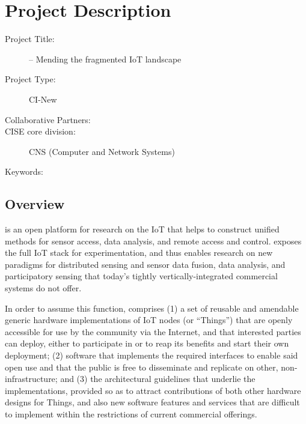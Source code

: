 
\section{Project Description}


\begin{description}
  \item[Project Title:] \sysname -- Mending the fragmented \acrshort{IoT} landscape
  \item[Project Type:] CI-New 
  \item[Collaborative Partners:] 
  \item[CISE core division:] CNS (Computer and Network Systems)
  \item[Keywords:] 
\end{description}


\subsection{Overview}

\sysname is an open platform for research on the \acrfull{IoT}
that helps to construct unified methods for sensor access, data analysis,
and remote access and control. \sysname exposes the full \gls{IoT}
stack for experimentation, and thus enables research on new paradigms
for distributed sensing and sensor data fusion, data analysis, and
participatory sensing that today's tightly vertically-integrated
commercial systems do not offer.

In order to assume this function, \sysname comprises
(1) a set of reusable and amendable generic hardware implementations of
\gls{IoT} nodes (or ``Things'') that are openly accessible for
use by the community via the Internet, and that interested parties
can deploy, either to participate in \sysname or to reap its benefits
and start their own deployment;
(2) software that implements the required interfaces to
enable said open use and that the public is free to disseminate
and replicate on other, non-\sysname infrastructure; and
(3) the architectural guidelines that underlie the implementations,
provided so as to attract contributions of both other hardware
designs for Things, and also new software features and services
that are difficult to implement within the restrictions of current
commercial offerings.


